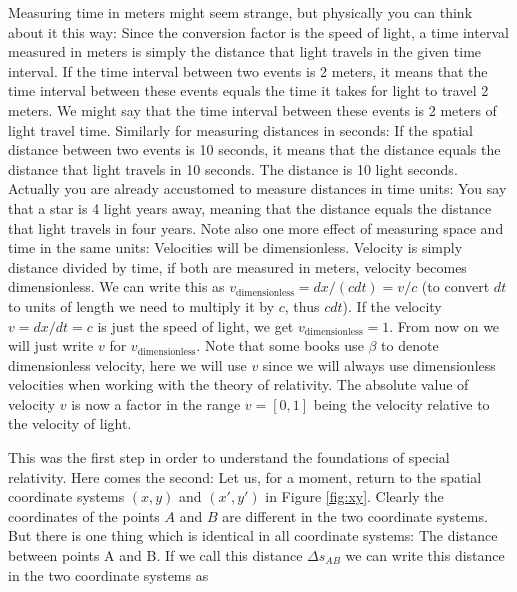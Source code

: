 {\begin{multicols}{2}
Measuring time in meters might seem strange, but physically you can think about it this way: Since the conversion factor is the speed of light, a time interval measured in meters is simply the distance that light travels in the given time interval. If the time interval between two events is 2 meters, it means that the time interval between these events equals the time it takes for light to travel 2 meters. We might say that the time interval between these events is 2 meters of light travel time. Similarly for measuring distances in seconds: If the spatial distance between two events is 10 seconds, it means that the distance equals the distance that light travels in 10 seconds. The distance is 10 light seconds. Actually you are already accustomed to measure distances in time units: You say that a star is 4 light years away, meaning that the distance equals the distance that light travels in four years. Note also one more effect of measuring space and time in the same units: Velocities will be dimensionless. Velocity is simply distance divided by time, if both are measured in meters, velocity becomes dimensionless. We can write this as $v_\mathrm{dimensionless}=dx/(cdt)=v/c$ (to convert $dt$ to units of length we need to multiply it by $c$, thus $cdt$). If the velocity $v=dx/dt=c$ is just the speed of light, we get $v_\mathrm{dimensionless}=1$. From now on we will just write $v$  for $v_\mathrm{dimensionless}$. Note that some books use $\beta$ to denote dimensionless velocity, here we will use $v$ since we will always use dimensionless velocities when working with the theory of relativity. The absolute value of velocity $v$ is now a factor in the range $v=[0,1]$ being the velocity relative to the velocity of light. 

This was the first step in order to understand the foundations of special relativity. Here comes the second: Let us, for a moment, return to the spatial coordinate systems $(x,y)$ and $(x',y')$ in Figure \ref{fig:xy}. Clearly the coordinates of the points $A$ and $B$ are different in the two coordinate systems. But there is one thing which is identical in all coordinate systems: The distance between points A and B. If we call this distance $\Delta s_{AB}$ we can write this distance in the two coordinate systems as



\end{multicols}}
